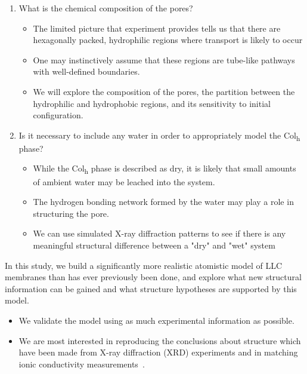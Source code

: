\documentclass{article}
\begin{document}
\begin{enumerate}
\begin{itemize}
	\end{itemize}
	\item What is the chemical composition of the pores?\label{point:composition}
	\begin{itemize}
		\item The limited picture that experiment provides tells us that there are
        hexagonally packed, hydrophilic regions where transport is likely to occur
		\item One may instinctively assume that these regions are tube-like pathways with 
		well-defined boundaries.
		\item We will explore the composition of the pores, the partition
		between the hydrophilic and hydrophobic regions, and its sensitivity to initial
		configuration. 
	\end{itemize}
    \item Is it necessary to include any water in order to appropriately model the 
    Col\textsubscript{h} phase? \label{point:water}
    \begin{itemize}
		\item While the Col\textsubscript{h} phase is described as dry, it is likely that small 
		amounts of ambient water may be leached into the system.
		\item The hydrogen bonding network formed by the water may play a role in structuring the
		pore.
		\item We can use simulated X-ray diffraction patterns to see if there is any meaningful 
		structural difference between a "dry" and "wet" system
    \end{itemize}
  \end{enumerate}

  In this study, we build a significantly more realistic atomistic model of LLC membranes
  than has ever previously been done, and explore what new structural information can be gained
  and what structure hypotheses are supported by this model.

  \begin{itemize}
    \item We validate the model using as much experimental information as possible.
    \item We are most interested in reproducing the conclusions about structure
    which have been made from X-ray diffraction (XRD) experiments and in matching ionic
    conductivity measurements~\cite{feng_thin_2016}.
  \end{itemize}
\end{document}
